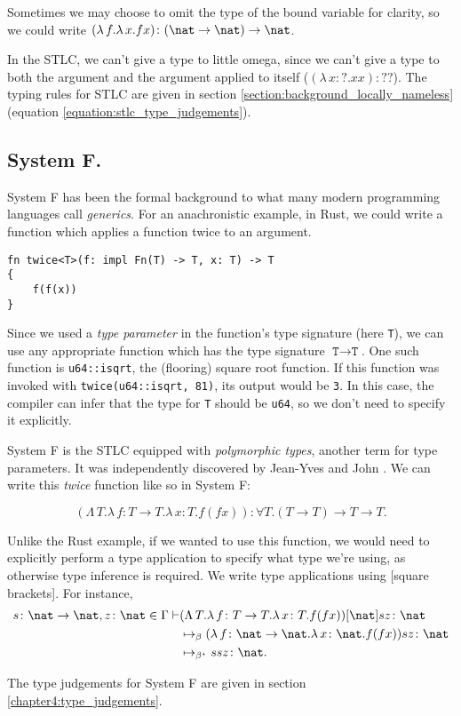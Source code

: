 Sometimes we may choose to omit the type of the bound variable for clarity, so we could write
$(\lambda \, f. \lambda \, x. fx) \colon (\nat \to \nat) \to \nat$.

In the STLC, we can't give a type to little omega, since we can't give a type to both the argument
and the argument applied to itself ($(\lambda \, x  \colon ? . x x) \colon ??$). The typing rules for
STLC are given in section \ref{section:background_locally_nameless} (equation \ref{equation:stlc_type_judgements}).

\subsection{System F.}
System F has been the formal background to what many modern programming
languages call \textit{generics}. For an anachronistic example, in Rust, we could write a function
which applies a function twice to an argument.

\begin{verbatim}
fn twice<T>(f: impl Fn(T) -> T, x: T) -> T
{
    f(f(x))
}
\end{verbatim}

Since we used a \textit{type parameter} in the function's type signature (here \texttt{T}), we can
use any appropriate function which has the type signature $\texttt{T} \to \texttt{T}$. One such
function is \texttt{u64::isqrt}, the (flooring) square root function. If this function was invoked
with \texttt{twice(u64::isqrt, 81)}, its output would be \texttt{3}. In this case, the compiler can
infer that the type for \texttt{T} should be \texttt{u64}, so we don't need to specify it
explicitly.

System F is the STLC equipped with \textit{polymorphic types}, another term for type parameters. It
was independently discovered by Jean-Yves \citet{girard_interpretation_1972} and John
\citet{goos_towards_1974}. We can write this \textit{twice} function like so in System F:

\begin{equation*}
  (\Lambda \, T. \lambda \, f \colon T \to T . \lambda \, x \colon T . f (f x))
  \colon \forall T . (T \to T) \to T \to T.
\end{equation*}

Unlike the Rust example, if we wanted to use this function, we would need to explicitly perform a
type application to specify what type we're using, as otherwise type inference is required. We write
type applications using [square brackets]. For instance,
\begin{align*}
  s \colon \nat \to \nat, z \colon \nat \in \Gamma \vdash
  &(\Lambda \, T. \lambda \, f \colon T \to T . \lambda \, x \colon T . f (f x))[\nat] s z \colon \nat\\
  &\mapsto_{\beta} (\lambda \, f \colon \nat \to \nat . \lambda \, x \colon \nat . f (f x)) s z \colon \nat\\
  &\mapsto_{\beta^{\star}} s s z \colon \nat.
\end{align*}

The type judgements for System F are given in section \ref{chapter4:type_judgements}.

